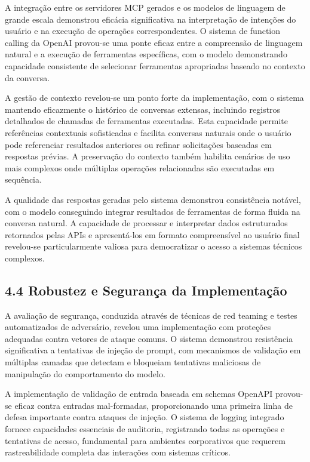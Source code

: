 \documentclass[
]{article}
\begin{document}
A integração entre os servidores MCP gerados e os modelos de linguagem
de grande escala demonstrou eficácia significativa na interpretação de
intenções do usuário e na execução de operações correspondentes. O
sistema de function calling da OpenAI provou-se uma ponte eficaz entre a
compreensão de linguagem natural e a execução de ferramentas
específicas, com o modelo demonstrando capacidade consistente de
selecionar ferramentas apropriadas baseado no contexto da conversa.

A gestão de contexto revelou-se um ponto forte da implementação, com o
sistema mantendo eficazmente o histórico de conversas extensas,
incluindo registros detalhados de chamadas de ferramentas executadas.
Esta capacidade permite referências contextuais sofisticadas e facilita
conversas naturais onde o usuário pode referenciar resultados anteriores
ou refinar solicitações baseadas em respostas prévias. A preservação do
contexto também habilita cenários de uso mais complexos onde múltiplas
operações relacionadas são executadas em sequência.

A qualidade das respostas geradas pelo sistema demonstrou consistência
notável, com o modelo conseguindo integrar resultados de ferramentas de
forma fluida na conversa natural. A capacidade de processar e
interpretar dados estruturados retornados pelas APIs e apresentá-los em
formato compreensível ao usuário final revelou-se particularmente
valiosa para democratizar o acesso a sistemas técnicos complexos.

\subsection{4.4 Robustez e Segurança da
Implementação}\label{robustez-e-seguranuxe7a-da-implementauxe7uxe3o}

A avaliação de segurança, conduzida através de técnicas de red teaming e
testes automatizados de adversário, revelou uma implementação com
proteções adequadas contra vetores de ataque comuns. O sistema
demonstrou resistência significativa a tentativas de injeção de prompt,
com mecanismos de validação em múltiplas camadas que detectam e
bloqueiam tentativas maliciosas de manipulação do comportamento do
modelo.

A implementação de validação de entrada baseada em schemas OpenAPI
provou-se eficaz contra entradas mal-formadas, proporcionando uma
primeira linha de defesa importante contra ataques de injeção. O sistema
de logging integrado fornece capacidades essenciais de auditoria,
registrando todas as operações e tentativas de acesso, fundamental para
ambientes corporativos que requerem rastreabilidade completa das
interações com sistemas críticos.
\end{document}
